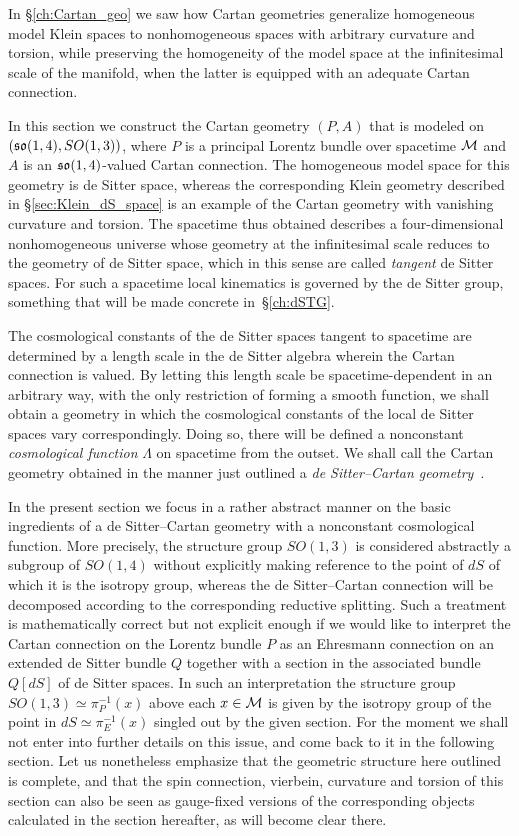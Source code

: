 \documentclass[
final,
11pt,
a4paper,
DIV=11,
headinclude=true,
footinclude=false,
bibliography=totoc,
twoside=true,  %
BCOR=5mm
]{scrbook}
\begin{document}
In \S\ref{ch:Cartan_geo} we saw how Cartan geometries generalize 
homogeneous model Klein spaces to nonhomogeneous spaces with 
arbitrary curvature and torsion, while preserving the homogeneity 
of the model space at the infinitesimal scale of the manifold, 
when the latter is equipped with an adequate Cartan connection.

In this section we construct the Cartan geometry $(P,A)$ that is 
modeled on $(\mathfrak{so}(1,4),\allowbreak SO(1,3))$, where $P$ is 
a principal Lorentz bundle over spacetime $\mathcal{M}$ and $A$ is an 
$\mathfrak{so}(1,4)$-valued Cartan connection. The homogeneous model 
space for this geometry is de Sitter space, whereas the 
corresponding Klein geometry described in 
\S\ref{sec:Klein_dS_space} is an example of the Cartan geometry 
with vanishing curvature and torsion. The spacetime thus obtained 
describes a four-dimensional nonhomogeneous universe whose 
geometry at the infinitesimal scale reduces to the geometry of de 
Sitter space, which in this sense are called \emph{tangent} de 
Sitter spaces. For such a spacetime local kinematics is governed 
by the de Sitter group, something that will be made concrete 
in~\S\ref{ch:dSTG}.

The cosmological constants of the de Sitter spaces tangent to 
spacetime are determined by a length scale in the de Sitter 
algebra wherein the Cartan connection is valued. By letting this 
length scale be spacetime-dependent in an arbitrary way, with the 
only restriction of forming a smooth function, we shall obtain 
a geometry in which the cosmological constants of the local de 
Sitter spaces vary correspondingly. Doing so, there will be 
defined a nonconstant \emph{cosmological function} $\Lambda$ on 
spacetime from the outset. We shall call the Cartan geometry 
obtained in the manner just outlined a \emph{de Sitter--Cartan 
  geometry}~\cite{Jennen:2014mba}.

In the present section we focus in a rather abstract manner on 
the basic ingredients of a de Sitter--Cartan geometry with 
a nonconstant cosmological function. More precisely, the 
structure group $SO(1,3)$ is considered abstractly a subgroup of 
$SO(1,4)$ without explicitly making reference to the point of 
$dS$ of which it is the isotropy group, whereas the de 
Sitter--Cartan connection will be decomposed according to the 
corresponding reductive splitting. Such a treatment is 
mathematically correct but not explicit enough if we would like 
to interpret the Cartan connection on the Lorentz bundle $P$ as 
an Ehresmann connection on an extended de Sitter bundle $Q$ 
together with a section in the associated bundle $Q[dS]$ of de 
Sitter spaces. In such an interpretation the structure group 
$SO(1,3) \simeq \pi_P^{-1}(x)$ above each $x \in \mathcal{M}$ is given 
by the isotropy group of the point in $dS \simeq \pi_E^{-1}(x)$ 
singled out by the given section. For the moment we shall not 
enter into further details on this issue, and come back to it in 
the following section. Let us nonetheless emphasize that the 
geometric structure here outlined is complete, and that the spin 
connection, vierbein, curvature and torsion of this section can 
also be seen as gauge-fixed versions of the corresponding objects 
calculated in the section hereafter, as will become clear there. 
\end{document}
